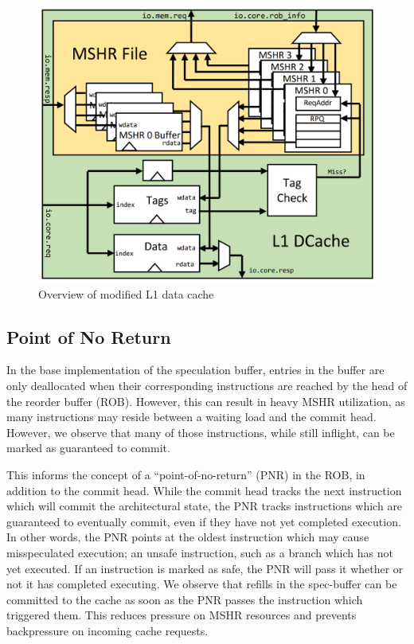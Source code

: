 \begin{figure}[h]
  \begin{center}\includegraphics[scale=0.17]{dcache.png}\end{center}
  \caption{Overview of modified L1 data cache}
\end{figure}

\subsection{Point of No Return}
In the base implementation of the speculation buffer, entries in the buffer are only deallocated when their corresponding instructions are reached by the head of the reorder buffer (ROB). However, this can result in heavy MSHR utilization, as many instructions may reside between a waiting load and the commit head. However, we observe that many of those instructions, while still inflight, can be marked as guaranteed to commit.

This informs the concept of a ``point-of-no-return'' (PNR) in the ROB, in addition to the commit head. While the commit head tracks the next instruction which will commit the architectural state, the PNR tracks instructions which are guaranteed to eventually commit, even if they have not yet completed execution. In other words, the PNR points at the oldest instruction which may cause misspeculated execution; an unsafe instruction, such as a branch which has not yet executed. If an instruction is marked as safe, the PNR will pass it whether or not it has completed executing. We observe that refills in the spec-buffer can be committed to the cache as soon as the PNR passes the instruction which triggered them. This reduces pressure on MSHR resources and prevents backpressure on incoming cache requests.

